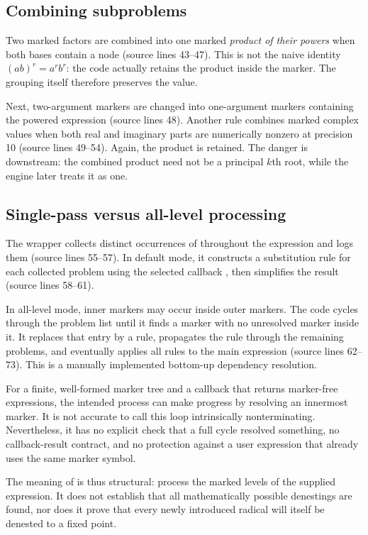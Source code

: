 \documentclass[11pt,letterpaper]{article}
\newcommand{\code}[1]{\texttt{\detokenize{#1}}}
\newcommand{\src}[1]{\textnormal{(source lines #1)}}
\theoremstyle{definition}
\begin{document}
\subsection{Combining subproblems}
Two marked factors are combined into one marked \emph{product of their powers}
when both bases contain a \code{Power} node \src{43--47}. This is not the naive
identity $(ab)^r=a^rb^r$: the code actually retains the product
\code{(rad1^pow1)*(rad2^pow2)} inside the marker. The grouping itself therefore
preserves the value.

Next, two-argument markers are changed into one-argument markers containing the
powered expression \src{48}. Another rule combines marked complex values when
both real and imaginary parts are numerically nonzero at precision 10
\src{49--54}. Again, the product is retained. The danger is downstream: the
combined product need not be a principal $k$th root, while the engine later treats
it as one.

\subsection{Single-pass versus all-level processing}
The wrapper collects distinct occurrences of \code{f[_]} throughout the expression
and logs them \src{55--57}. In default mode, it constructs a substitution rule for
each collected problem using the selected callback \code{func}, then simplifies
the result \src{58--61}.

In all-level mode, inner markers may occur inside outer markers. The code cycles
through the problem list until it finds a marker with no unresolved marker inside
it. It replaces that entry by a rule, propagates the rule through the remaining
problems, and eventually applies all rules to the main expression \src{62--73}.
This is a manually implemented bottom-up dependency resolution.

For a finite, well-formed marker tree and a callback that returns marker-free
expressions, the intended process can make progress by resolving an innermost
marker. It is not accurate to call this loop intrinsically nonterminating.
Nevertheless, it has no explicit check that a full cycle resolved something,
no callback-result contract, and no protection against a user expression that
already uses the same marker symbol.

The meaning of \code{alllevels -> True} is thus structural: process the marked
levels of the supplied expression. It does not establish that all mathematically
possible denestings are found, nor does it prove that every newly introduced
radical will itself be denested to a fixed point.
\end{document}
